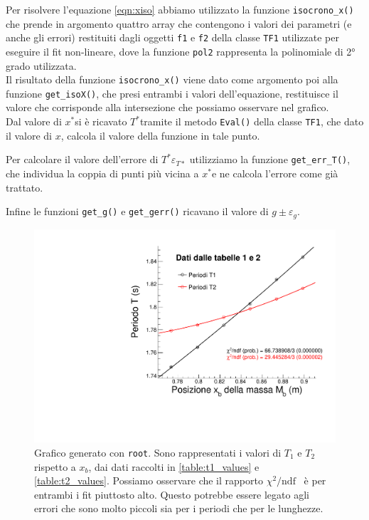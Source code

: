 \documentclass[italian, a4paper, 10pt, twocolumn]{../../style/lab_unige}
\newcommand{\stdErr}[1]{$\varepsilon_{#1}$}
\newcommand{\mstdErr}[1]{\varepsilon_{#1}}
\newcommand{\ChiNdf}{$\chi^2/\text{ndf}$}
\newcommand{\cernroot}{\texttt{root}}
\newcommand{\Tiso}{$T^*$}
\newcommand{\xiso}{$x^*$}
\begin{document}
    Per risolvere l'equazione \ref{eqn:xiso} abbiamo utilizzato la funzione \verb|isocrono_x()| che prende in argomento quattro array che contengono i valori dei parametri (e anche gli errori) restituiti dagli oggetti  \verb|f1| e \verb|f2| della classe \verb|TF1| utilizzate per eseguire il fit non-lineare, dove la funzione \verb|pol2| rappresenta la polinomiale di 2° grado utilizzata.\\
    Il risultato della funzione \verb|isocrono_x()| viene dato come argomento poi alla funzione \verb|get_isoX()|, che presi entrambi i valori dell'equazione, restituisce il valore che corrisponde alla intersezione che possiamo osservare nel grafico.\\
    Dal valore di \xiso si è ricavato \Tiso tramite il metodo \verb|Eval()| della classe \verb|TF1|, che dato il valore di $x$, calcola il valore della funzione in tale punto.

    Per calcolare il valore dell'errore di \Tiso \stdErr{T*} utilizziamo la funzione \verb|get_err_T()|, che individua la coppia di punti più vicina a \xiso e ne calcola l'errore come già trattato.

    Infine le funzioni \verb|get_g()| e \verb|get_gerr()| ricavano il valore di $g\pm\mstdErr{g}$.

    \begin{figure}
        \includegraphics[width=\linewidth]{kater_plot.pdf}
        \caption{Grafico generato con \cernroot. Sono rappresentati i valori di $T_1$ e $T_2$ rispetto a $x_b$, dai dati raccolti in \autoref{table:t1_values} e \autoref{table:t2_values}. Possiamo osservare che il rapporto \ChiNdf~ è per entrambi i fit piuttosto alto. Questo potrebbe essere legato agli errori che sono molto piccoli sia per i periodi che per le lunghezze. }
        \label{figure:plot}
    \end{figure}
\end{document}
